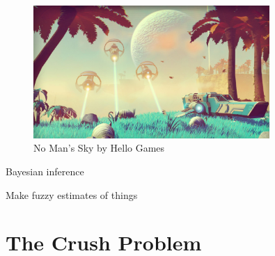 \documentclass[aspectratio=169,xcolor=svgnames]{beamer}
\begin{document}
\begin{frame}
  \begin{figure}[ht]
    \centering
    \includegraphics[width=0.8\textwidth]{figures/no-mans-sky-screenshot.jpg}
    \caption{No Man's Sky by Hello Games}
  \end{figure}
\end{frame}

\begin{frame}
  \center
  \huge
  Bayesian inference

  \small
  Make fuzzy estimates of things
\end{frame}

\section{The Crush Problem}

\newcommand{\love}[0]{{\NotoEmoji ❤️}\xspace}
\newcommand{\flowers}[0]{{\emoji{bouquet}}\xspace}
\end{document}
